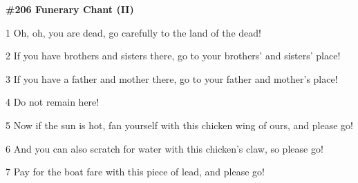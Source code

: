 
\textbf{\#206 Funerary Chant  (II)}

1 Oh, oh, you are dead, go carefully to the land of the dead!

2 If you have brothers and sisters there, go to your brothers'  and sisters' place!

3 If you have a father and mother there, go to your father and mother's place!

4 Do not remain here!

5 Now if the sun is hot, fan yourself with this chicken wing of ours, and please
go!

6 And you can also scratch for water with this chicken's claw, so please go!

7 Pay for the boat fare with this piece of lead, and please go!

